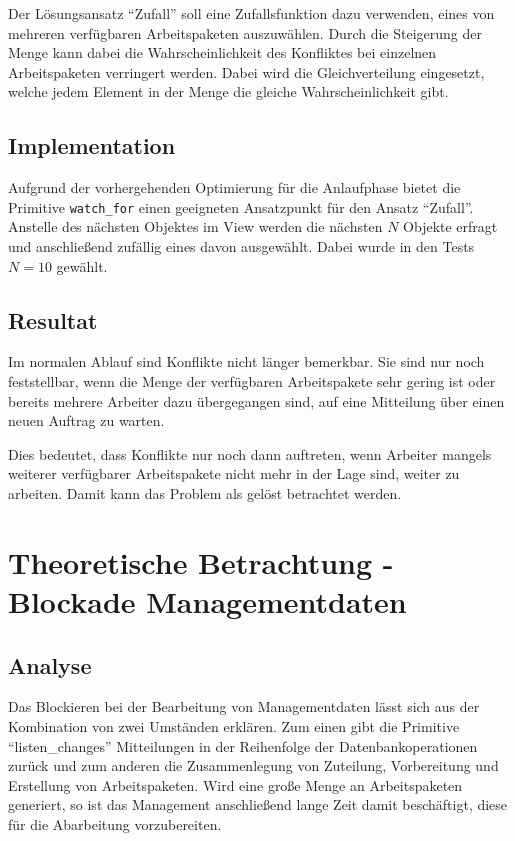Der Lösungsansatz ``Zufall'' soll eine Zufallsfunktion dazu verwenden,
eines von mehreren verfügbaren Arbeitspaketen auszuwählen.
Durch die Steigerung der Menge kann dabei die Wahrscheinlichkeit des Konfliktes bei einzelnen Arbeitspaketen verringert werden. Dabei wird die Gleichverteilung eingesetzt, welche jedem Element in der Menge die gleiche Wahrscheinlichkeit gibt.

\subsection{Implementation}

Aufgrund der vorhergehenden Optimierung für die Anlaufphase
bietet die Primitive \verb|watch_for| einen geeigneten Ansatzpunkt für den Ansatz ``Zufall''.
Anstelle des nächsten Objektes im View werden die nächsten $N$ Objekte erfragt
und anschließend zufällig eines davon ausgewählt.
Dabei wurde in den Tests $N = 10$ gewählt.

\subsection{Resultat}
Im normalen Ablauf sind Konflikte nicht länger bemerkbar.
Sie sind nur noch feststellbar, wenn die Menge der verfügbaren Arbeitspakete
sehr gering ist oder bereits mehrere Arbeiter dazu übergegangen sind,
auf eine Mitteilung über einen neuen Auftrag zu warten.

Dies bedeutet, dass Konflikte nur noch dann auftreten,
wenn Arbeiter mangels weiterer verfügbarer Arbeitspakete nicht mehr in der Lage sind, weiter zu arbeiten. Damit kann das Problem als gelöst betrachtet werden.

\section{Theoretische Betrachtung - Blockade Managementdaten}
\label{cha:opt:lock-management}
\subsection{Analyse}
Das Blockieren bei der Bearbeitung von Managementdaten lässt sich
aus der Kombination von zwei Umständen erklären.
Zum einen gibt die Primitive ``listen\_changes'' Mitteilungen
in der Reihenfolge der Datenbankoperationen zurück und
zum anderen die Zusammenlegung von Zuteilung, Vorbereitung
und Erstellung von Arbeitspaketen.
Wird eine große Menge an Arbeitspaketen generiert,
so ist das Management anschließend lange Zeit damit beschäftigt,
diese für die Abarbeitung vorzubereiten.

